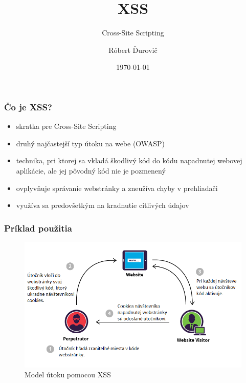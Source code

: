 \documentclass[hyperref={unicode}]{beamer}
\title{XSS}
\subtitle{Cross-Site Scripting}
\author{Róbert Ďurovič}
\institute{FIT VUT}
\date{\today}
\begin{document}
\begin{frame}
    \titlepage
\end{frame}

\begin{frame}
    \frametitle{Čo je XSS?}
    \begin{itemize}
        \item skratka pre Cross-Site Scripting
        \item druhý najčastejší typ útoku na webe (OWASP)
        \item technika, pri ktorej sa vkladá škodlivý kód do kódu napadnutej webovej aplikácie, ale jej pôvodný kód nie je pozmenený
        \item ovplyvňuje správanie webstránky a zneužíva chyby v prehliadači
        \item využíva sa predovšetkým na kradnutie citlivých údajov
    \end{itemize}    
\end{frame}

\begin{frame}
    \frametitle{Príklad použitia}
    \begin{figure}
        \includegraphics[scale=0.5]{xss.png}
        \caption{Model útoku pomocou XSS}
    \end{figure}
\end{frame}
\end{document}
